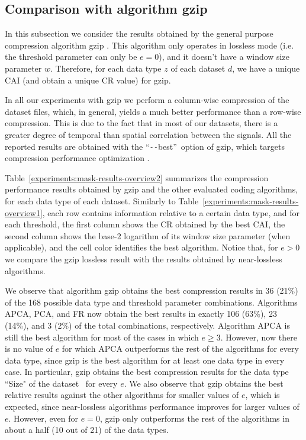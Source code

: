 
\subsection{Comparison with algorithm gzip}
\label{secX:gzip}


\newcommand{\bestdash}{``\texttt{-{}-}best''}
In this subsection we consider the results obtained by the general purpose compression algorithm gzip \cite{gzip}. This algorithm only operates in lossless mode (i.e. the threshold parameter can only be $e=0$), and it doesn't have a window size parameter $w$. Therefore, for each data type $z$ of each dataset $d$, we have a unique CAI (and obtain a unique CR value) for gzip. 

In all our experiments with gzip we perform a column-wise compression of the dataset files, which, in general, yields a much better performance than a row-wise compression. This is due to the fact that in most of our datasets, there is a greater degree of temporal than spatial correlation between the signals. All the reported results are obtained with the \bestdash\ option of gzip, which targets compression performance optimization \cite{gzipman}. 


Table~\ref{experiments:mask-results-overview2} summarizes the compression performance results obtained by gzip and the other evaluated coding algorithms, for each data type of each dataset. Similarly to Table~\ref{experiments:mask-results-overview1}, each row contains information relative to a certain data type, and for each threshold, the first column shows the CR obtained by the best CAI, the second column shows the base-2 logarithm of its window size parameter (when applicable), and the cell color identifies the best algorithm. Notice that, for $e > 0$ we compare the gzip lossless result with the results obtained by near-lossless algorithms.


We observe that algorithm gzip obtains the best compression results in 36 (21\%) of the 168 possible data type and threshold parameter combinations. Algorithms APCA, PCA, and FR now obtain the best results in exactly 106 (63\%), 23 (14\%), and 3 (2\%) of the total combinations, respectively. Algorithm APCA is still the best algorithm for most of the cases in which $e \geq 3$. However, now there is no value of $e$ for which APCA outperforms the rest of the algorithms for every data type, since gzip is the best algorithm for at least one data type in every case. In particular, gzip obtains the best compression results for the data type ``Size" of the dataset \datasethail\ for every $e$. We also observe that gzip obtains the best relative results against the other algorithms for smaller values of $e$, which is expected, since near-lossless algorithms performance improves for larger values of $e$. However, even for $e=0$, gzip only outperforms the rest of the algorithms in about a half (10 out of 21) of the data types.


